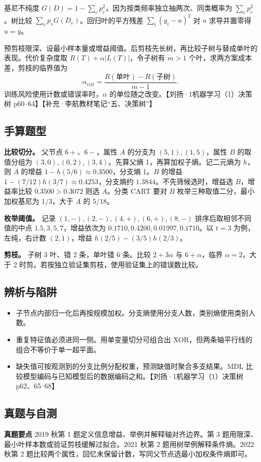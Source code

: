 \documentclass[UTF8,a4paper,zihao=-4,fontset=fandol]{ctexart}
\begin{document}
基尼不纯度 \(G(D)=1-\sum_c p_c^2\)，因为按类频率独立抽两次、同类概率为 \(\sum_c p_c^2\)。树比较 \(\sum_vp_vG(D_v)\)。回归叶的平方残差 \(\sum_i(y_i-u)^2\) 对 \(u\) 求导并置零得 \(u=\bar y\)。

预剪枝限深、设最小样本量或增益阈值。后剪枝先长树，再比较子树与替成单叶的表现。代价复杂度取 \(R(T)+\alpha|L(T)|\)，令子树有 \(m>1\) 个叶，求两方案成本差，剪枝的临界值为
\[
 \alpha_{\mathrm{crit}}=\frac{R(\text{单叶})-R(\text{子树})}{m-1}.
\]
训练风险使用计数或错误率时，\(\alpha\) 的单位随之改变。【刘扬·1机器学习（1）决策树 p60–64】【补充·李航教材笔记“五、决策树”】

\subsection{手算题型}
\textbf{比较切分。} 父节点 \(6+\)、\(6-\)，属性 \(A\) 的分支为 \((5,1),(1,5)\)，属性 \(B\) 的取值分组为 \((3,0),(0,2),(3,4)\)。先算父熵 1，再算加权子熵。记二元熵为 \(h\)，则 \(A\) 的增益 \(1-h(5/6)\approx0.3500\)，分支熵 1。\(B\) 的增益 \(1-(7/12)h(3/7)\approx0.4253\)，分支熵约 \(1.3844\)。不先筛候选时，增益选 \(B\)，增益率比较 \(0.3500>0.3072\) 则选 \(A\)。分类 CART 要对 \(B\) 枚举三种取值二分，最小加权基尼为 \(1/3\)，大于 \(A\) 的 \(5/18\)。

\textbf{枚举阈值。} 记录 \((1,-),(2,-),(4,+),(6,+),(8,-)\) 排序后取相邻不同值的中点 \(1.5,3,5,7\)，增益依次为 \(0.1710,0.4200,0.01997,0.1710\)。以 \(t=3\) 为例，左纯，右计数 \((2,1)\)，增益 \(h(2/5)-(3/5)h(2/3)\)。

\textbf{剪枝。} 子树 3 叶、错 2 条，单叶错 6 条。比较 \(2+3\alpha\) 与 \(6+\alpha\)，临界 \(\alpha=2\)，大于 2 时剪。若按独立验证集剪枝，使用验证集上的错误数比较。

\subsection{辨析与陷阱}
\begin{itemize}[nosep]
\item 子节点内部归一化后再按规模加权。分支熵使用分支人数，类别熵使用类别人数。
\item 重复特征值必须进同一侧。用单变量切分可组合出 XOR，但两条轴平行线的组合不等价于单一超平面。
\item 缺失值可按观测到的分支比例分配权重，预测缺值时聚合多支结果。MDL 比较模型编码与已知模型后的数据编码之和。【刘扬·1机器学习（1）决策树 p62、65–68】
\end{itemize}

\subsection{真题与自测}
\textbf{真题要点} 2019 秋第 1 题定义信息增益、举例并解释轴对齐边界。第 3 题用限深、最小叶样本数或验证剪枝缓解过拟合。2021 秋第 2 题用树举例解释条件熵。2022 秋第 2 题比较两个属性，回忆未保留计数，写同父节点选最小加权条件熵即可。
\end{document}
